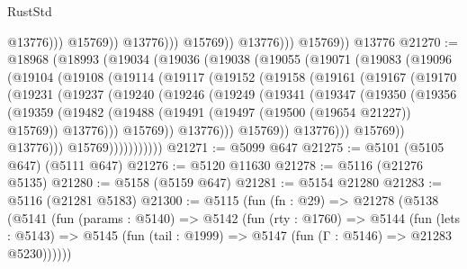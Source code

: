\begin{lexlean}{RustStd}
\begin{coremodule}
                                  @13776)))
                            @15769))
                        @13776)))
                  @15769))
              @13776)))
        @15769))
    @13776
@21270 := @18968
    (@18993
      (@19034
        (@19036
          (@19038
            (@19055
              (@19071
                (@19083
                  (@19096
                    (@19104
                      (@19108
                        (@19114
                          (@19117
                            (@19152
                              (@19158
                                (@19161
                                  (@19167
                                    (@19170
                                      (@19231
                                        (@19237
                                          (@19240
                                            (@19246
                                              (@19249
                                                (@19341
                                                  (@19347
                                                    (@19350
                                                      (@19356
                                                        (@19359
                                                          (@19482
                                                            (@19488
                                                              (@19491
                                                                (@19497
                                                                  (@19500 (@19654 @21227))
                                                                  @15769))
                                                              @13776)))
                                                        @15769))
                                                    @13776)))
                                              @15769))
                                          @13776)))
                                    @15769))
                                @13776)))
                          @15769)))))))))))
@21271 := @5099 @647
@21275 := @5101 (@5105 @647) (@5111 @647)
@21276 := @5120 @11630
@21278 := @5116 (@21276 @5135)
@21280 := @5158 (@5159 @647)
@21281 := @5154 @21280
@21283 := @5116 (@21281 @5183)
@21300 := @5115
    (fun (fn : @29) =>
    @21278
      (@5138
        (@5141
          (fun (params : @5140) =>
          @5142
            (fun (rty : @1760) =>
            @5144
              (fun (lets : @5143) =>
              @5145 (fun (tail : @1999) => @5147 (fun (Γ : @5146) => @21283 @5230))))))

\end{coremodule}
\end{lexlean}
